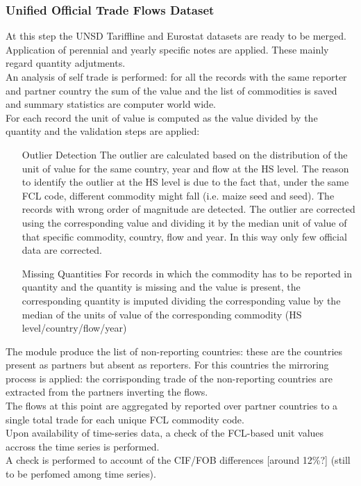 \documentclass[nojss]{jss}\usepackage[]{graphicx}\usepackage[]{color}
\begin{document}
\subsubsection{Unified Official Trade Flows Dataset}
At this step the UNSD Tariffline and Eurostat datasets are ready to be merged.\\
Application of perennial and yearly specific notes are applied. These mainly regard quantity adjutments.\\
An analysis of self trade is performed: for all the records with the same reporter and partner country the sum of the value and the list of commodities is saved and summary statistics are computer world wide.\\
For each record the unit of value is computed as the value divided by the quantity and the validation steps are applied:
\begin{itemize}
\item[Outlier Detection] The outlier are calculated based on the distribution of the unit of value for the same country, year and flow at the HS level. The reason to identify the outlier at the HS level is due to the fact that, under the same FCL code, different commodity might fall (i.e. maize seed and seed). The records with wrong order of magnitude are detected. The outlier are corrected using the corresponding value and dividing it by the median unit of value of that specific commodity, country, flow and year. In this way only few official data are corrected.
\item[Missing Quantities] For records in which the commodity has to be reported in quantity and the quantity is missing and the value is present, the corresponding quantity is imputed dividing the corresponding value by the median of the units of value of the corresponding commodity (HS level/country/flow/year)
\end{itemize}

The module produce the list of non-reporting countries: these are the countries present as partners but absent as reporters. For this countries the mirroring process is applied: the corrisponding trade of the non-reporting countries are extracted from the partners inverting the flows.\\

The flows at this point are aggregated by reported over partner countries to a single total trade for each unique FCL commodity code.\\
Upon availability of time-series data, a check of the FCL-based unit values accross the time series is performed.\\
A check is performed to account of the CIF/FOB differences [around 12\%?] (still to be perfomed among time series).
\end{document}
